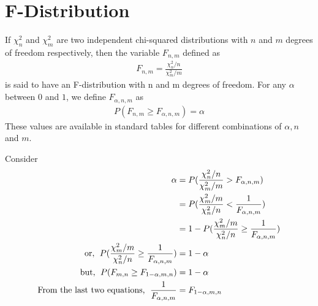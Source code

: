\documentclass[../probability-notes.tex]{subfiles}
\begin{document}
    \section{F-Distribution}
    If $\chi_{n}^{2}$ and $\chi_{m}^{2}$ are two independent chi-squared distributions with $n$ and $m$ degrees of freedom respectively, then the variable $F_{n,m}$ defined as
    \begin{align*}
        F_{n,m} = \frac{\chi_{n}^{2}/n}{\chi_{m}^{2}/m}
    \end{align*}
    is said to have an F-distribution with n and m degrees of freedom.\newline
    For any $\alpha$ between $0$ and $1$, we define $F_{\alpha, n, m}$ as
    \begin{align*}
        P(F_{n,m} \geq F_{\alpha, n, m}) = \alpha
    \end{align*}
    These values are available in standard tables for different combinations of $\alpha, n$ and $m$.\newline

    Consider
    \begin{align*}
        \alpha &= P(\frac{\chi_{n}^{2}/n}{\chi_{m}^{2}/m} > F_{\alpha, n, m})\\
        &= P(\frac{\chi_{m}^{2}/m}{\chi_{n}^{2}/n} < \frac{1}{F_{\alpha, n, m}})\\
        &= 1 - P(\frac{\chi_{m}^{2}/m}{\chi_{n}^{2}/n} \geq \frac{1}{F_{\alpha, n, m}})\\
        \text{or, \;} P(\frac{\chi_{m}^{2}/m}{\chi_{n}^{2}/n} \geq \frac{1}{F_{\alpha, n, m}}) &= 1 - \alpha\\
        \text{but, \;} P(F_{m,n} \geq F_{1 - \alpha, m, n}) &= 1 - \alpha\\
        \text{From the last two equations, \;} \frac{1}{F_{\alpha, n, m}} &= F_{1-\alpha, m, n}
    \end{align*}
\end{document}
